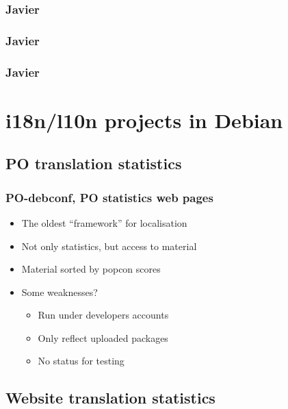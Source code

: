 \documentclass{beamer}
\begin{document}
\begin{frame}
  \frametitle{Javier}
\end{frame}

\begin{frame}
  \frametitle{Javier}
\end{frame}

\begin{frame}
  \frametitle{Javier}
\end{frame}

\section{i18n/l10n projects in Debian}

\subsection{PO translation statistics}

\begin{frame}
  \frametitle{PO-debconf, PO statistics web pages}
	\begin{itemize}
	\item
		The oldest ``framework'' for localisation
	\item
		Not only statistics, but access to material
	\item
		Material sorted by popcon scores
	\item
		Some weaknesses?
		\begin{itemize}
		\item
			Run under developers accounts
		\item
			Only reflect uploaded packages
		\item
			No status for testing
		\end{itemize}
	\end{itemize}
\end{frame}



\subsection{Website translation statistics}
\end{document}
